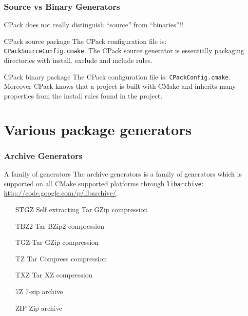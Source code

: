 \documentclass[compress,slidestop,table,usepdftitle=false
              ]
               {beamer}
\newcommand{\fname}[1]{\texttt{#1}}
\begin{document}
\begin{frame}[label=cpackworkflow]
\end{frame}

\begin{frame}
\frametitle{Source vs Binary Generators}
\alert{CPack does not really distinguish ``source'' from ``binaries''!!}
\begin{block}{CPack source package}
The CPack configuration file is: \fname{CPackSourceConfig.cmake}.
The CPack source generator is essentially packaging directories with
install, exclude and include rules.
\end{block}
\begin{block}{CPack binary package}
The CPack configuration file is: \fname{CPackConfig.cmake}.
Moreover CPack knows that a project is built with CMake and
inherits many properties from the install rules found in
the project.
\end{block}

\end{frame}

\section{Various package generators}
\begin{frame}
\frametitle{Archive Generators}
\begin{block}{A family of generators}
The archive generators is a family of generators which is supported
on all CMake supported platforms through \fname{libarchive}:
\url{http://code.google.com/p/libarchive/}.
\end{block}
\begin{itemize}
\item[STGZ] Self extracting Tar GZip compression
\item[TBZ2] Tar BZip2 compression
\item[TGZ]  Tar GZip compression
\item[TZ]   Tar Compress compression
\item[TXZ]  Tar XZ compression
\item[7Z]   7-zip archive
\item[ZIP]  Zip archive
\end{itemize}
\end{frame}
\end{document}
